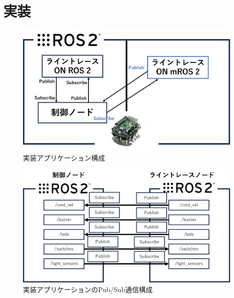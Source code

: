 \chapter{実装}
\begin{figure}[ht]
    \centering
    \includegraphics[width=15cm]{images/fig4_raspimouse_configuration.png}
    \caption{実装アプリケーション構成}
    \label{fig:mros2_ros2_raspimouse_configuration}
\end{figure}
\begin{figure}[h]
    \centering
    \includegraphics[width=15cm]{images/fig4_pubsub_configuration.png}
    \caption{実装アプリケーションのPub/Sub通信構成}
    \label{fig:mros2_ros2_pubsub_configuration}
\end{figure}


